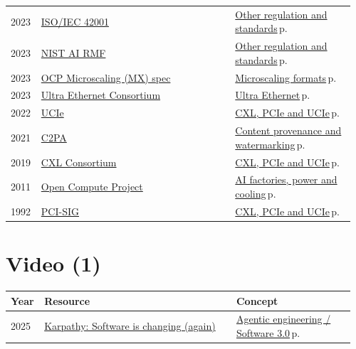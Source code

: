 \documentclass[10pt,a4paper,openany]{report}
\begin{document}
{\begin{longtable}{@{}p{0.07\linewidth}>{\raggedright}p{0.55\linewidth}>{\raggedright\arraybackslash}p{0.34\linewidth}@{}}
2023 & \href{https://www.iso.org/standard/81230.html}{ISO/IEC 42001} & \hyperref[c:safety-12]{Other regulation and standards}\,{\color{muted}\scriptsize p.\,\pageref{c:safety-12}}\\
2023 & \href{https://www.nist.gov/itl/ai-risk-management-framework}{NIST AI RMF} & \hyperref[c:safety-12]{Other regulation and standards}\,{\color{muted}\scriptsize p.\,\pageref{c:safety-12}}\\
2023 & \href{https://www.opencompute.org/documents/ocp-microscaling-formats-mx-v1-0-spec-final-pdf}{OCP Microscaling (MX) spec} & \hyperref[c:quant-0]{Microscaling formats}\,{\color{muted}\scriptsize p.\,\pageref{c:quant-0}}\\
2023 & \href{https://ultraethernet.org}{Ultra Ethernet Consortium} & \hyperref[c:hardware-5]{Ultra Ethernet}\,{\color{muted}\scriptsize p.\,\pageref{c:hardware-5}}\\
2022 & \href{https://www.uciexpress.org}{UCIe} & \hyperref[c:hardware-7]{CXL, PCIe and UCIe}\,{\color{muted}\scriptsize p.\,\pageref{c:hardware-7}}\\
2021 & \href{https://c2pa.org}{C2PA} & \hyperref[c:safety-14]{Content provenance and watermarking}\,{\color{muted}\scriptsize p.\,\pageref{c:safety-14}}\\
2019 & \href{https://computeexpresslink.org}{CXL Consortium} & \hyperref[c:hardware-7]{CXL, PCIe and UCIe}\,{\color{muted}\scriptsize p.\,\pageref{c:hardware-7}}\\
2011 & \href{https://www.opencompute.org}{Open Compute Project} & \hyperref[c:hardware-12]{AI factories, power and cooling}\,{\color{muted}\scriptsize p.\,\pageref{c:hardware-12}}\\
1992 & \href{https://pcisig.com}{PCI-SIG} & \hyperref[c:hardware-7]{CXL, PCIe and UCIe}\,{\color{muted}\scriptsize p.\,\pageref{c:hardware-7}}\\
\end{longtable}}
\section{Video (1)}
{\small\begin{longtable}{@{}p{0.07\linewidth}>{\raggedright}p{0.55\linewidth}>{\raggedright\arraybackslash}p{0.34\linewidth}@{}}
\textbf{\sffamily Year} & \textbf{\sffamily Resource} & \textbf{\sffamily Concept}\\ \hline\endhead
2025 & \href{https://www.youtube.com/watch?v=LCEmiRjPEtQ}{Karpathy: Software is changing (again)} & \hyperref[c:coding-2]{Agentic engineering / Software 3.0}\,{\color{muted}\scriptsize p.\,\pageref{c:coding-2}}\\
\end{longtable}}
\end{document}
